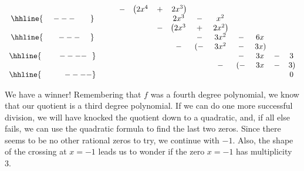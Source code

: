 {\begin{enumerate}
{\[\begin{array}{ccccccccccccc}
  &  &  &  -& \left(2x^4 \right.& + & \left.2x^3\right) &  &  &  &  &    \\ \hhline{~~~~---~~~~~~} 
  &  &  &   &    &   &  2x^3    & - & x^2 &  &  &  &  \\ 
  &  &  &   &    & - &  \left(2x^3\right. & +  & \left. 2x^2\right) & &  &  &     \\ 
\hhline{~~~~~~---~~~~} 
  &  &  &   &    &   &                    &  - & 3x^2 & - & 6x & & \\
  &  &  &   &    &   &                  - &\left(-\right. & 3x^2 & - & \left.3x\right) & & \\
 \hhline{~~~~~~~----~~}   
  &  &  &   &    &   &  &  &  & - & 3x & - &3 \\
  &  &  &   &    &   &  &  & - &\left(-\right. & 3x & - & \left.3\right)\\
 \hhline{~~~~~~~~~----}
  &  &  &   &    &   &  &  &   &               &    &   & 0 

 \end{array}\]
 
\setlength\arraycolsep{5pt}
\setlength\extrarowheight{0pt}

}
We have a winner!  Remembering that $f$ was a fourth degree polynomial, we know that our quotient is a third degree polynomial.  If we can do one more successful division, we will have knocked the quotient down to a quadratic, and, if all else fails, we can use the quadratic formula to find the last two zeros.  Since there seems to be no other rational zeros to try, we continue with $-1$.  Also, the shape of the crossing at $x = -1$ leads us to wonder if the zero $x = -1$ has multiplicity 3.

\end{enumerate}}
